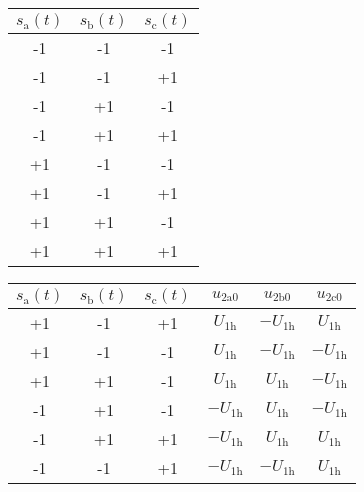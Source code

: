 \begin{solutionblock}
    \begin{minipage}{0.3\textwidth}
            \begin{tabular}{|c|c|c|} %
            \hline
            \bfseries $s_\mathrm{a}(t)$ & \bfseries $s_\mathrm{b}(t)$ & \bfseries $s_\mathrm{c}(t)$ \\ \hline
            -1 & -1 & -1 \\ \hline
            -1 & -1 & +1 \\ \hline
            -1 & +1 & -1 \\ \hline
            -1 & +1 & +1 \\ \hline
            +1 & -1 & -1 \\ \hline
            +1 & -1 & +1 \\ \hline
            +1 & +1 & -1 \\ \hline
            +1 & +1 & +1 \\ \hline
        \end{tabular}
        \noindent
        \label{stable:ex07_Task2_Switchingstates}    
    \end{minipage}
    \hfill
    \begin{minipage}{0.55\textwidth} 
        \begin{tabular}{|c|c|c|c|c|c|} %
            \hline
            \bfseries $s_\mathrm{a}(t)$ & \bfseries $s_\mathrm{b}(t)$ & \bfseries $s_\mathrm{c}(t)$
            & \bfseries $u_\mathrm{2a0}$ & \bfseries $u_\mathrm{2b0}$ & \bfseries $u_\mathrm{2c0}$ \\ \hline
            +1 & -1 & +1 & $U_\mathrm{1h}$ & $-U_\mathrm{1h}$ & $U_\mathrm{1h}$ \\ \hline
            +1 & -1 & -1 & $U_\mathrm{1h}$ & $-U_\mathrm{1h}$ & $-U_\mathrm{1h}$ \\ \hline
            +1 & +1 & -1 & $U_\mathrm{1h}$ & $U_\mathrm{1h}$ & $-U_\mathrm{1h}$ \\ \hline
            -1 & +1 & -1 & $-U_\mathrm{1h}$ & $U_\mathrm{1h}$ & $-U_\mathrm{1h}$ \\ \hline
            -1 & +1 & +1 & $-U_\mathrm{1h}$ & $U_\mathrm{1h}$ & $U_\mathrm{1h}$ \\ \hline
            -1 & -1 & +1 & $-U_\mathrm{1h}$ & $-U_\mathrm{1h}$ & $U_\mathrm{1h}$ \\ \hline
        \end{tabular}
        \label{stable:ex07_Task2_UsedSwitchingStates}    

\end{minipage}
\end{solutionblock}
